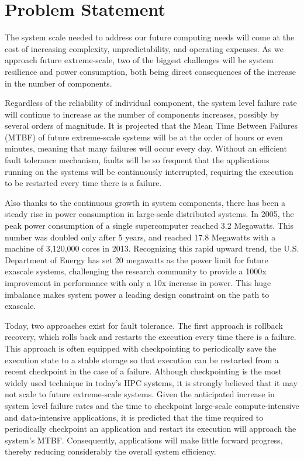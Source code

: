 \section{Problem Statement}

The system scale needed to address our future computing needs will come at the cost of increasing complexity, unpredictability, 
and operating expenses. As we approach future extreme-scale, two of the biggest challenges will be system resilience and power 
consumption, both being direct consequences of the increase in the number of components. 

Regardless of the reliability of individual component, the system level failure rate will continue to increase as the number of 
components increases, possibly by several orders of magnitude. It is projected that the Mean Time Between Failures (MTBF) of future extreme-scale systems will be at the order of hours or even minutes, meaning 
that many failures will occur every day. Without an efficient fault tolerance mechanism, faults will be so frequent that the applications running on the 
systems will be continuously interrupted, requiring the execution to be restarted every time there is a failure. 

Also thanks to the continuous growth in system components, there has been a steady rise in power consumption in large-scale distributed systems. 
In 2005, the peak power consumption of a single supercomputer reached 3.2 Megawatts. This number was doubled only after 5 years, and reached 17.8 
Megawatts with a machine of 3,120,000 cores in 2013. Recognizing this rapid upward trend, the U.S. Department of Energy has set 20 
megawatts as the power limit for future exascale systems, 
challenging the research community to provide a 1000x improvement in performance with only a 10x increase in power. 
This huge imbalance makes system power a leading design constraint on the path to exascale. 

Today, two approaches exist for fault tolerance. The first approach is rollback recovery, which rolls back and restarts the execution 
every time there is a failure. This approach is often equipped with checkpointing to periodically save the execution state to a 
stable storage so that execution can be restarted from a recent checkpoint in the case of a failure. 
Although checkpointing is the most widely used technique in today's HPC systems, it is strongly believed that it may not scale to 
future extreme-scale systems. Given the anticipated increase in system level failure rates and the time to checkpoint large-scale 
compute-intensive and data-intensive applications, it is predicted that the time required to periodically checkpoint an application 
and restart its execution will approach the system's MTBF. Consequently, applications will make little forward progress, thereby 
reducing considerably the overall system efficiency. 

